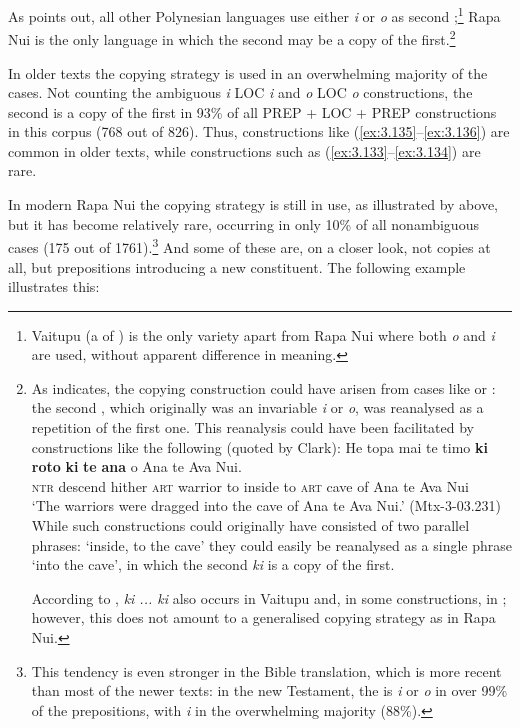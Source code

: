 As \citet[54–55]{Clark1976} points out, all other Polynesian languages use either \textit{i} or \textit{o} as second ;\footnote{\label{fn:142}Vaitupu (a  of ) is the only variety apart from Rapa Nui where both \textit{o} and \textit{i} are used, without apparent difference in meaning.} Rapa Nui is the only language in which the second  may be a copy of the first.\footnote{\label{fn:143}As \citet[56–57]{Clark1976} indicates, the copying construction could have arisen from cases like  or : the second , which originally was an invariable \textit{i} or \textit{o}, was reanalysed as a repetition of the first one. This reanalysis could have been facilitated by constructions like the following (quoted by Clark):
\ea
\gll
He topa mai te timo \textbf{ki} \textbf{roto} \textbf{ki} \textbf{te} \textbf{{\ꞌ}ana} o {\ꞌ}Ana te Ava Nui.\\
\textsc{ntr} descend hither \textsc{art} warrior to inside to \textsc{art} cave of Ana te Ava Nui\\
\glt 
‘The warriors were dragged into the cave of Ana te Ava Nui.’ (Mtx-3-03.231)
\z While such constructions could originally have consisted of two parallel phrases: ‘inside, to the cave’ they could easily be reanalysed as a single phrase ‘into the cave’, in which the second \textit{ki} is a copy of the first.

According to \citet[27–28]{FinneyAlexander1998}, \textit{ki ... ki} also occurs in Vaitupu and, in some constructions, in ; however, this does not amount to a generalised copying strategy as in Rapa Nui.} 

In older texts the copying strategy is used in an overwhelming majority of the cases. Not counting the ambiguous \textit{{\ꞌ}i} LOC \textit{i} and \textit{o} LOC \textit{o} constructions, the second  is a copy of the first in 93\% of all PREP + LOC + PREP constructions in this corpus (768 out of 826). Thus, constructions like (\ref{ex:3.135}–\ref{ex:3.136}) are common in older texts, while constructions such as (\ref{ex:3.133}–\ref{ex:3.134}) are rare. 

In modern Rapa Nui the copying strategy is still in use, as illustrated by  above, but it has become relatively rare, occurring in only 10\% of all nonambiguous cases (175 out of 1761).\footnote{\label{fn:144}This tendency is even stronger in the Bible translation, which is more recent than most of the newer texts: in the new Testament, the  is \textit{i} or \textit{o} in over 99\% of the prepositions, with \textit{i} in the overwhelming majority (88\%).} And some of these are, on a closer look, not copies at all, but prepositions introducing a new constituent. The following example illustrates this:

